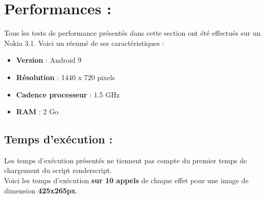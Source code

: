 \section{Performances :}
Tous les tests de performance présentés dans cette section ont été effectués sur un Nokia 3.1.
Voici un résumé de ses caractéristiques :
\begin{itemize} [label=\textbullet]
  \item \textbf{Version} : Android 9
  \item \textbf{Résolution}	: 1440 x 720 pixels
  \item \textbf{Cadence processeur} : 1.5 GHz
  \item \textbf{RAM} : 2 Go
\end{itemize}

\subsection{Temps d'exécution :}

Les temps d'exécution présentés ne tiennent pas compte du premier temps de chargement du script renderscript.
\\

Voici les temps d'exécution \textbf{sur 10 appels} de chaque effet pour une image de dimension \textbf{425x265px}.
\\

